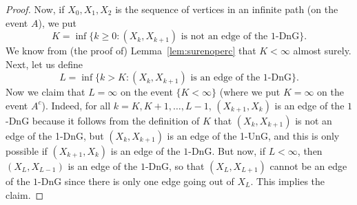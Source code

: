 \documentclass[oneside]{amsart}
\theoremstyle{definition}
\newcommand{\1}{\mathbbm{1}}
\newcommand{\0}{\mathbf{o}}
\numberwithin{equation}{section}
\begin{document}
\begin{proof}

Now, if $X_0,X_1,X_2$ is the sequence of vertices in an infinite path (on the event $A$), we put
\[ K=\inf \{ k \geq 0 \colon (X_k,X_{k+1}) \text{ is not an edge of the $1$-DnG} \}. \]
We know from (the proof of) Lemma~\ref{lem:surenoperc} that $K<\infty$ almost surely. Next, let us define
\[ L=\inf \{ k > K \colon 
(X_{k},X_{k+1})\text{ is an edge of the 1-DnG}\}. \]
Now we claim that $L=\infty$ on the event $\{ K<\infty\}$ (where we put $K=\infty$ on the event $A^c$). Indeed, for all $k=K,K+1,\ldots,L-1$, $(X_{k+1},X_k)$ is an edge of the $1$-DnG because it follows from the definition of $K$ that $(X_{k},X_{k+1})$ is not an edge of the 1-DnG, but $(X_k,X_{k+1})$ is an edge of the 1-UnG, and this is only possible if $(X_{k+1},X_k)$ is an edge of the $1$-DnG. But now, if $L<\infty$, then $(X_{L},X_{L-1})$ is an edge of the $1$-DnG, so that $(X_{L},X_{L+1})$ cannot be an edge of the $1$-DnG since there is only one edge going out of $X_L$. This implies the claim.



\end{proof}
\end{document}
